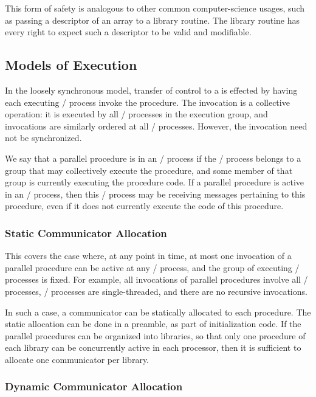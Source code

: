 This form of safety is analogous to other common computer-science
usages, such as passing a descriptor of an array to a library routine.
The library routine has every right to expect such a descriptor to
be valid and modifiable.

\subsection{Models of Execution}
\label{sec:context:models-of-execution}

In the loosely synchronous model, transfer of control to a
 is effected by having each executing \MPI/ process
invoke the procedure. The invocation is a collective operation: it
is executed by all \MPI/ processes in the execution group, and invocations
are similarly ordered at all \MPI/ processes. However, the invocation need
not be synchronized.

We say that a parallel procedure is  in an \MPI/ process if the \MPI/ process
belongs to a group that may collectively execute the procedure, and
some member of that group is currently executing the procedure code.
If a parallel procedure is active in an \MPI/ process, then this \MPI/ process may
be receiving messages pertaining to this procedure, even if it
does not currently execute the code of this procedure.


\subsubsection{Static Communicator Allocation}
\label{sec:context:static-comm}

This covers the case where, at any point in time, at most one
invocation of a parallel procedure can be active at any \MPI/ process, and
the group of executing \MPI/ processes is fixed.
For example, all
invocations of parallel procedures involve all \MPI/ processes, \MPI/ processes
are single-threaded, and there are no recursive invocations.

In such a case, a communicator can be statically allocated to each
procedure. The static allocation can be done in a preamble, as part
of initialization code. If the
parallel procedures can be organized into libraries, so that only one
procedure of each library can be concurrently active in each
processor, then it is sufficient to allocate one communicator per library.

\subsubsection{Dynamic Communicator Allocation}
\label{sec:context:dynamic-comm}

